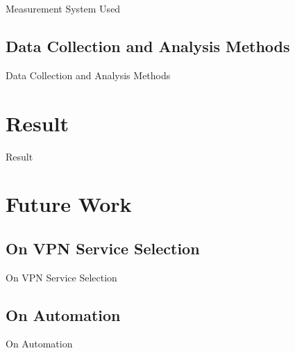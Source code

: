 \documentclass{beamer}
\begin{document}
\begin{frame}{Measurement System Used}
\end{frame}

\subsection{Data Collection and Analysis Methods}

\begin{frame}{Data Collection and Analysis Methods}
\end{frame}

\section{Result}

\begin{frame}{Result}
\end{frame}

\section{Future Work}

\subsection{On VPN Service Selection}

\begin{frame}{On VPN Service Selection}
\end{frame}

\subsection{On Automation}

\begin{frame}{On Automation}
\end{frame}
\end{document}
